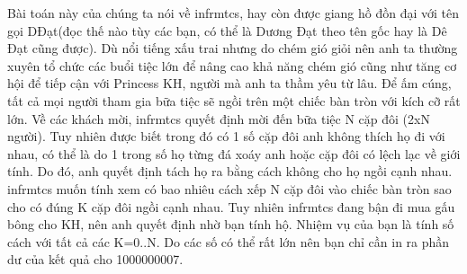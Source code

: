 Bài toán này của chúng ta nói về infrmtcs, hay còn được giang hồ đồn đại với tên gọi DĐạt(đọc thế nào tùy các bạn, có thể là Dương Đạt theo tên gốc hay là Dê Đạt cũng được). Dù nổi tiếng xấu trai nhưng do chém gió giỏi nên anh ta thường xuyên tổ chức các buổi tiệc lớn để nâng cao khả năng chém gió cũng như tăng cơ hội để tiếp cận với Princess KH, người mà anh ta thầm yêu từ lâu. Để ấm cúng, tất cả mọi người tham gia bữa tiệc sẽ ngồi trên một chiếc bàn tròn với kích cỡ rất lớn. Về các khách mời, infrmtcs quyết định mời đến bữa tiệc N cặp đôi (2xN người). Tuy nhiên được biết trong đó có 1 số cặp đôi anh không thích họ đi với nhau, có thể là do 1 trong số họ từng đá xoáy anh hoặc cặp đôi có lệch lạc về giới tính. Do đó, anh quyết định tách họ ra bằng cách không cho họ ngồi cạnh nhau. infrmtcs muốn tính xem có bao nhiêu cách xếp N cặp đôi vào chiếc bàn tròn sao cho có đúng K cặp đôi ngồi cạnh nhau. Tuy nhiên infrmtcs đang bận đi mua gấu bông cho KH, nên anh quyết định nhờ bạn tính hộ. Nhiệm vụ của bạn là tính số cách với tất cả các K=0..N. Do các số có thể rất lớn nên bạn chỉ cần in ra phần dư của kết quả cho 1000000007.